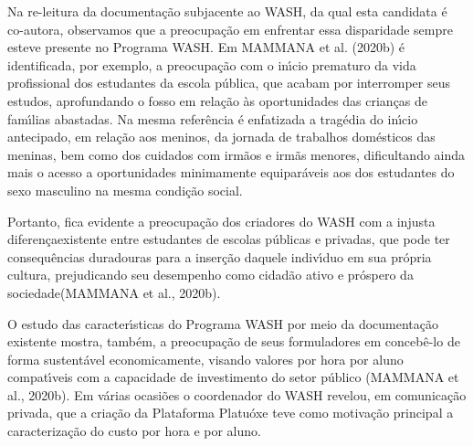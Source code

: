 \documentclass[
12pt,		%
openright,	%
twoside,  %
a4paper,			%
chapter=TITLE,		%
english,			%
french,				%
spanish,			%
brazil				%
]{USPSC-classe/USPSC}
\begin{document}
Na re-leitura da documenta\c{c}\~ao subjacente ao WASH, da qual esta candidata \'e co-autora, observamos que a preocupa\c{c}\~ao em enfrentar essa disparidade sempre esteve presente no Programa WASH. Em  MAMMANA et al. (2020b) \'e identificada, por exemplo, a preocupa\c{c}\~ao com o in\'{\i}cio prematuro da vida profissional dos estudantes da escola p\'ublica, que acabam por interromper seus estudos, aprofundando o fosso em rela\c{c}\~ao \`as oportunidades das crian\c{c}as de fam\'{\i}lias abastadas. Na mesma refer\^encia \'e enfatizada a trag\'edia do in\'{\i}cio antecipado, em rela\c{c}\~ao aos meninos, da jornada de trabalhos dom\'esticos das meninas, bem como dos cuidados com irm\~aos e irm\~as menores, dificultando ainda mais o acesso a oportunidades minimamente equipar\'aveis aos dos estudantes do sexo masculino na mesma condi\c{c}\~ao social.









Portanto, fica evidente a preocupa\c{c}\~ao dos criadores do WASH com a \textquotedbl injusta diferen\c{c}a\textquotedbl  existente entre estudantes de escolas p\'ublicas e privadas, que \textquotedbl pode ter consequ\^encias duradouras para a inser\c{c}\~ao daquele indiv\'{\i}duo em sua pr\'opria cultura, prejudicando seu desempenho como cidad\~ao ativo e pr\'ospero da sociedade\textquotedbl   (MAMMANA et al., 2020b).










\noindent\begin{center}\mbox{\centering{}}\end{center}


O estudo das caracter\'{\i}sticas do Programa WASH por meio da documenta\c{c}\~ao existente mostra, tamb\'em, a preocupa\c{c}\~ao de seus formuladores em conceb\^e-lo de forma sustent\'avel economicamente, visando valores por hora por aluno compat\'{\i}veis com a capacidade de investimento do setor p\'ublico  (MAMMANA et al., 2020b). Em v\'arias ocasi\~oes o coordenador do WASH revelou, em comunica\c{c}\~ao privada, que a cria\c{c}\~ao da Plataforma Platu\'oxe teve como motiva\c{c}\~ao principal a caracteriza\c{c}\~ao do custo por hora e por aluno.
\end{document}
